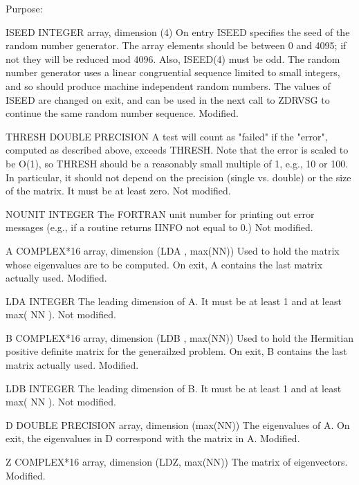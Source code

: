 \begin{DoxyParagraph}{Purpose\+: }
\begin{DoxyVerb}
  ISEED   INTEGER array, dimension (4)
          On entry ISEED specifies the seed of the random number
          generator. The array elements should be between 0 and 4095;
          if not they will be reduced mod 4096.  Also, ISEED(4) must
          be odd.  The random number generator uses a linear
          congruential sequence limited to small integers, and so
          should produce machine independent random numbers. The
          values of ISEED are changed on exit, and can be used in the
          next call to ZDRVSG to continue the same random number
          sequence.
          Modified.

  THRESH  DOUBLE PRECISION
          A test will count as "failed" if the "error", computed as
          described above, exceeds THRESH.  Note that the error
          is scaled to be O(1), so THRESH should be a reasonably
          small multiple of 1, e.g., 10 or 100.  In particular,
          it should not depend on the precision (single vs. double)
          or the size of the matrix.  It must be at least zero.
          Not modified.

  NOUNIT  INTEGER
          The FORTRAN unit number for printing out error messages
          (e.g., if a routine returns IINFO not equal to 0.)
          Not modified.

  A       COMPLEX*16 array, dimension (LDA , max(NN))
          Used to hold the matrix whose eigenvalues are to be
          computed.  On exit, A contains the last matrix actually
          used.
          Modified.

  LDA     INTEGER
          The leading dimension of A.  It must be at
          least 1 and at least max( NN ).
          Not modified.

  B       COMPLEX*16 array, dimension (LDB , max(NN))
          Used to hold the Hermitian positive definite matrix for
          the generailzed problem.
          On exit, B contains the last matrix actually
          used.
          Modified.

  LDB     INTEGER
          The leading dimension of B.  It must be at
          least 1 and at least max( NN ).
          Not modified.

  D       DOUBLE PRECISION array, dimension (max(NN))
          The eigenvalues of A. On exit, the eigenvalues in D
          correspond with the matrix in A.
          Modified.

  Z       COMPLEX*16 array, dimension (LDZ, max(NN))
          The matrix of eigenvectors.
          Modified.


\end{DoxyVerb}
\end{DoxyParagraph}
